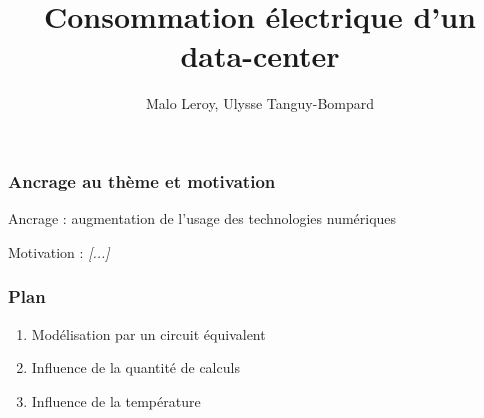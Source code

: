 \documentclass[a4paper,11pt]{beamer}
\title{Consommation électrique d'un data-center}
\author{Malo Leroy, Ulysse Tanguy-Bompard}
\begin{document}

\maketitle %


\begin{frame}
\frametitle{Ancrage au thème et motivation}
Ancrage : augmentation de l'usage des technologies numériques

Motivation : \textit{[...]}
\end{frame}

\begin{frame}
    \frametitle{Plan}
    \begin{enumerate}
        \item Modélisation par un circuit équivalent
        \item Influence de la quantité de calculs
        \item Influence de la température
    \end{enumerate}
\end{frame}
\end{document}
